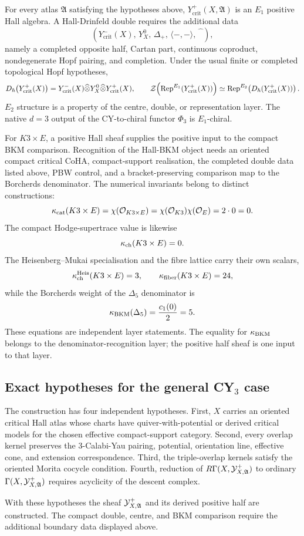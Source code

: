 For every atlas $\mathfrak A$ satisfying the hypotheses above,
$Y^{+}_{\mathrm{crit}}(X,\mathfrak A)$ is an $E_1$ positive Hall
algebra.  A Hall-Drinfeld double requires the additional data
\[
  \left(
    Y^{-}_{\mathrm{crit}}(X),\,
    Y^{0}_{X},\,
    \Delta_{+},\,
    \langle-,-\rangle,\,
    \widehat{\phantom{Y}}
  \right),
\]
namely a completed opposite half, Cartan part, continuous coproduct,
nondegenerate Hopf pairing, and completion.  Under the usual finite or
completed topological Hopf hypotheses,
\[
  D_{\hbar}\!\left(Y^{+}_{\mathrm{crit}}(X)\right)
  =
  Y^{-}_{\mathrm{crit}}(X)
  \widehat\otimes
  Y^{0}_{X}
  \widehat\otimes
  Y^{+}_{\mathrm{crit}}(X),
  \qquad
  \mathcal Z\!\left(\mathrm{Rep}^{E_1}(Y^{+}_{\mathrm{crit}}(X))\right)
  \simeq
  \mathrm{Rep}^{E_2}\!\left(D_{\hbar}(Y^{+}_{\mathrm{crit}}(X))\right).
\]
$E_2$ structure is a property of the centre, double, or representation
layer.  The native $d=3$ output of the CY-to-chiral functor $\Phi_{3}$
is $E_1$-chiral.

For $K3\times E$, a positive Hall sheaf supplies the positive input to
the compact BKM comparison.  Recognition of the Hall-BKM object needs
an oriented compact critical CoHA, compact-support realisation, the
completed double data listed above, PBW control, and a bracket-preserving
comparison map to the Borcherds denominator.  The numerical invariants
belong to distinct constructions:
\[
  \kappa_{\mathrm{cat}}(K3\times E)
  =
  \chi(\mathcal O_{K3\times E})
  =
  \chi(\mathcal O_{K3})\chi(\mathcal O_E)
  =
  2\cdot 0
  =
  0.
\]
The compact Hodge-supertrace value is likewise
\[
  \kappa_{\mathrm{ch}}(K3\times E)=0.
\]
The Heisenberg--Mukai specialisation and the fibre lattice carry their
own scalars,
\[
  \kappa_{\mathrm{ch}}^{\mathrm{Heis}}(K3\times E)=3,
  \qquad
  \kappa_{\mathrm{fiber}}(K3\times E)=24,
\]
while the Borcherds weight of the $\Delta_{5}$ denominator is
\[
  \kappa_{\mathrm{BKM}}(\Delta_{5})=\frac{c_{1}(0)}{2}=5.
\]
These equations are independent layer statements.  The equality for
$\kappa_{\mathrm{BKM}}$ belongs to the denominator-recognition layer; the positive half
sheaf is one input to that layer.

\subsection*{Exact hypotheses for the general CY$_3$ case}

The construction has four independent hypotheses.  First, $X$ carries an
oriented critical Hall atlas whose charts have quiver-with-potential or
derived critical models for the chosen effective compact-support
category.  Second, every overlap kernel preserves the $3$-Calabi-Yau
pairing, potential, orientation line, effective cone, and extension
correspondence.  Third, the triple-overlap kernels satisfy the oriented
Morita cocycle condition.  Fourth, reduction of
$R\Gamma(X,\mathcal Y^{+}_{X,\mathfrak A})$ to ordinary
$\Gamma(X,\mathcal Y^{+}_{X,\mathfrak A})$ requires acyclicity of the descent
complex.

With these hypotheses the sheaf $\mathcal Y^{+}_{X,\mathfrak A}$ and its
derived positive half are constructed.  The compact double, centre, and
BKM comparison require the additional boundary data displayed above.
